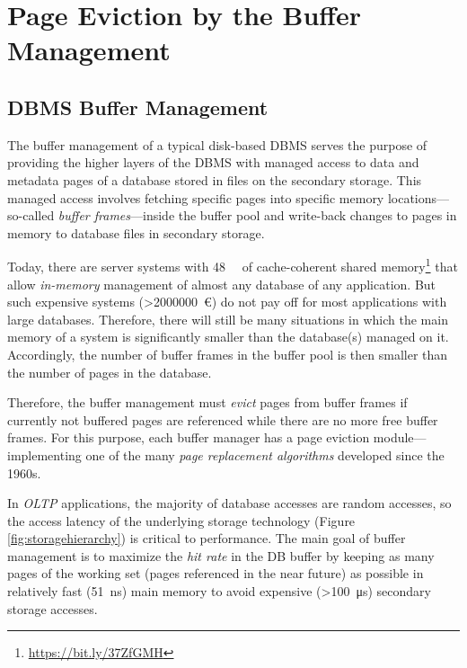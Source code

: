 \chapter[Buffer Manager Page Eviction]{Page Eviction by the Buffer Management} \label{ch:page_evictioners}

\section{DBMS Buffer Management} \label{sec:page_evictioners_purpose}

    The buffer management of a typical disk-based DBMS serves the purpose of providing the higher layers of the DBMS with managed access to data and metadata pages of a database stored in files on the secondary storage. This managed access involves fetching specific pages into specific memory locations---so-called \emph{buffer frames}---inside the buffer pool and write-back changes to pages in memory to database files in secondary storage.

    Today, there are server systems with \SI{48}{\tebi\byte} of cache-coherent shared memory\footnote{\url{https://bit.ly/37ZfGMH}} that allow \emph{in-memory} management of almost any database of any application. But such expensive systems (\SI{>2000000}{\euro}) do not pay off for most applications with large databases. Therefore, there will still be many situations in which the main memory of a system is significantly smaller than the database(s) managed on it. Accordingly, the number of buffer frames in the buffer pool is then smaller than the number of pages in the database.

    Therefore, the buffer management must \emph{evict} pages from buffer frames if currently not buffered pages are referenced while there are no more free buffer frames. For this purpose, each buffer manager has a page eviction module---implementing one of the many \emph{page replacement algorithms} developed since the 1960s.

    In \emph{OLTP} applications, the majority of database accesses are random accesses, so the access latency of the underlying storage technology (Figure \ref{fig:storagehierarchy}) is critical to performance. The main goal of buffer management is to maximize the \emph{hit rate} in the DB buffer by keeping as many pages of the working set (pages referenced in the near future) as possible in relatively fast (\SI{51}{\nano\second}) main memory to avoid expensive (\SI{>100}{\micro\second}) secondary storage accesses.


